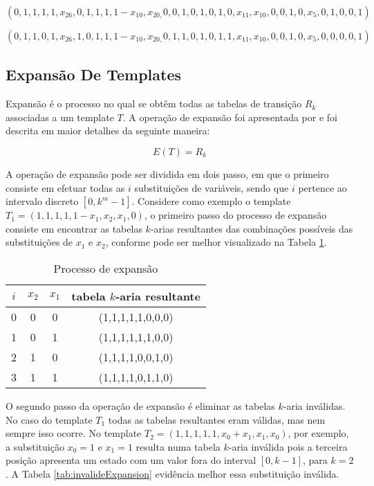 \begin{equation}
\left(0,1,1,1,1,x_{26},0,1,1,1,1-x_{10},x_{20,}0,0,1,0,1,0,1,0,x_{11},x_{10},0,0,1,0,x_5,0,1,0,0,1\right)
\label{eq:templateParidade1}
\end{equation}

\begin{equation}
\left(0,1,1,0,1,x_{26},1,0,1,1,1-x_{10},x_{20,}0,1,1,0,1,0,1,1,x_{11},x_{10},0,0,1,0,x_5,0,0,0,0,1\right)
\label{eq:templateParidade2}
\end{equation}


\newpage\newpage
\subsection{Expansão De Templates}
	Expansão é o processo no qual se obtêm todas as tabelas de transição $R_k$ associadas a um template $T$.
	A operação de expansão foi apresentada por \cite{daCosta2014} e foi descrita em maior detalhes da seguinte maneira:

	\begin{equation}
	E(T)=R_k
	\end{equation}

	A operação de expansão pode ser dividida em dois passo, em que o primeiro consiste em efetuar todas as $i$ substituições de variáveis, sendo que $i$ pertence ao intervalo discreto $[0,k^m-1]$. Considere como exemplo o template $T_1 = (1,1,1,1,1-x_1,x_2,x_1,0)$, o primeiro passo do processo de expansão consiste em encontrar as tabelas $k$-arias resultantes das combinações possíveis das substituições de $x_1$ e $x_2$, conforme pode ser melhor visualizado na Tabela \ref{tab:expansionProcess}.

	\begin{table}[h!]
	\centering
	\caption{Processo de expansão}
	{
		\vspace{0.3cm}
		\begin{tabular}{cccc}
		\hline
		$i$ & $x_2$ & $x_1$ & tabela $k$-aria resultante \\
		\hline
		0	&	0	&	0	&	(1,1,1,1,1,0,0,0)	\\
		1	&	0	&	1	&	(1,1,1,1,1,1,0,0)	\\
		2	&	1	&	0	&	(1,1,1,1,0,0,1,0)	\\
		3	&	1	&	1	&	(1,1,1,1,0,1,1,0)	\\
		\hline
		\end{tabular}
	}
	\label{tab:expansionProcess}
	\end{table}

	O segundo passo da operação de expansão é eliminar as tabelas $k$-aria inválidas. No caso do template $T_1$ todas as tabelas resultantes eram válidas, mas nem sempre isso ocorre. No template $T_2 = (1,1,1,1,1,x_0+x_1,x_1,x_0)$, por exemplo, a substituição $x_0 = 1$ e $x_1 = 1$ resulta numa tabela $k$-aria inválida pois a terceira posição apresenta um estado com um valor fora do interval $[0,k-1]$, para $k=2$. A Tabela \ref{tab:invalideExpansion} evidência melhor essa substituição inválida.


